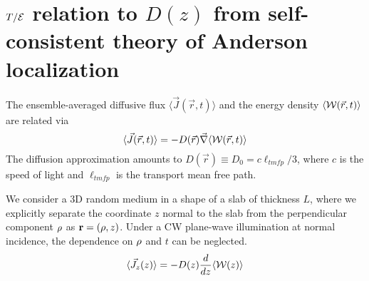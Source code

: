 \section{$T/{\cal E}$ relation to $D(z)$ from self-consistent theory of Anderson localization}
\label{sec:appendix_TE_Dz_relation}


The ensemble-averaged diffusive flux $\langle\vec{J}(\vec{r},t)\rangle$ and the energy density $\langle {\cal W}(\vec{r},t)\rangle$ are related via \cite{1953_Morse}
\begin{equation}
\langle\vec{J}(\vec{r},t)\rangle=-D(\vec{r})\vec{\nabla}\langle {\cal W}(\vec{r},t)\rangle
\label{eq:Jflux}
\end{equation}
The diffusion approximation amounts to $D(\vec{r})\equiv D_0=c\ell_{tmfp}/3$, where $c$ is the speed of light and $\ell_{tmfp}$ is the transport mean free path.

We consider a 3D random medium in a shape of a slab of thickness $L$, where we explicitly  separate the coordinate $z$ normal to the slab from the perpendicular component ${\bf \rho}$ as ${\bf r}=({\bf \rho},z)$. Under a CW plane-wave illumination at normal incidence, the dependence on ${\bf \rho}$ and $t$ can be neglected. 
\begin{equation}
\langle\vec{J}_z(z)\rangle=-D(z)\frac{d}{dz}\langle {\cal W}(z)\rangle
\end{equation}

